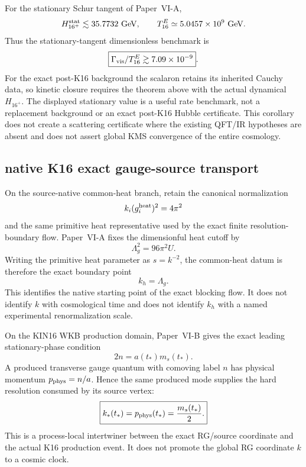 \documentclass[12pt,a4paper]{article}
\begin{document}
\begin{corollary}
\label{p12:cor:v296-k16-rate-certificate}
For the stationary Schur tangent of Paper~VI-A,
\[
 H_{16^+}^{\rm stat}\lesssim35.7732\ {\rm GeV},
 \qquad
 T_{16}^{E}\simeq5.0457\times10^9\ {\rm GeV}.
\]
Thus the stationary-tangent dimensionless benchmark is
\[
 \boxed{\Gamma_{\rm vis}/T_{16}^{E}\gtrsim7.09\times10^{-9}}.
\]
For the exact post-K16 background the scalaron retains its inherited Cauchy
data, so kinetic closure requires the theorem above with the actual dynamical
$H_{16^+}$.  The displayed stationary value is a useful rate benchmark, not a
replacement background or an exact post-K16 Hubble certificate.  This
corollary does not create a scattering certificate where the existing QFT/IR
hypotheses are absent and does not assert global KMS convergence of the entire
cosmology.
\end{corollary}



\subsection{native K16 exact gauge-source transport}
\label{p12:sec:v2177-k16-exact-source-transport}

\begin{theorem}
\label{p12:thm:v2177-common-heat-resolution-boundary}
On the source-native common-heat branch, retain the canonical normalization
\[
 k_i(g_i^{\rm heat})^2=4\pi^2
\]
and the same primitive heat representative used by the exact finite
resolution-boundary flow.  Paper~VI-A fixes the dimensionful heat cutoff by
\[
 \Lambda_g^2=96\pi^2U.
\]
Writing the primitive heat parameter as $s=k^{-2}$, the common-heat datum is
therefore the exact boundary point
\[
 \boxed{k_h=\Lambda_g.}
\]
This identifies the native starting point of the exact blocking flow.  It does
not identify $k$ with cosmological time and does not identify $k_h$ with a
named experimental renormalization scale.
\end{theorem}

\begin{theorem}
\label{p12:thm:v2177-k16-resonance-scale}
On the KIN16 WKB production domain, Paper~VI-B gives the exact leading
stationary-phase condition
\[
 \boxed{2n=a(t_*)m_s(t_*).}
\]
A produced transverse gauge quantum with comoving label $n$ has physical
momentum $p_{\rm phys}=n/a$.  Hence the same produced mode supplies the hard
resolution consumed by its source vertex:
\[
 \boxed{k_*(t_*)=p_{\rm phys}(t_*)=\frac{m_s(t_*)}{2}.}
\]
This is a process-local intertwiner between the exact RG/source coordinate and
the actual K16 production event.  It does not promote the global RG coordinate
$k$ to a cosmic clock.
\end{theorem}
\end{document}
